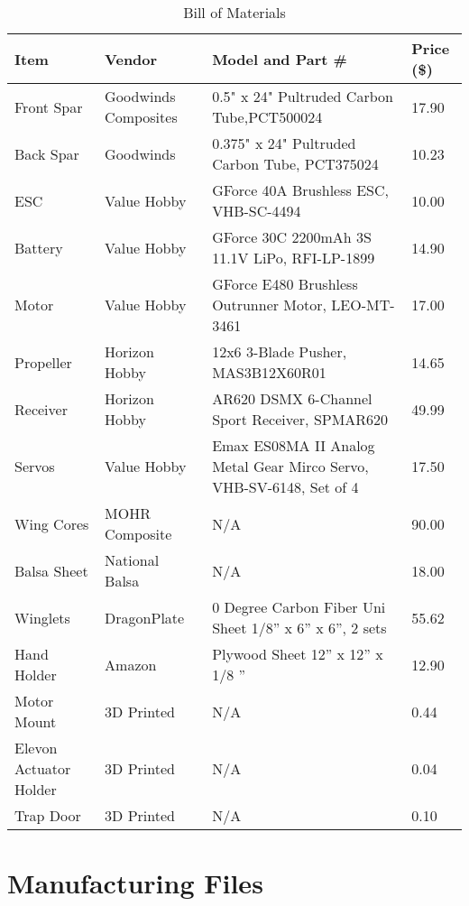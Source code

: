     \begin{table}[H]
    \centering
    \caption{Bill of Materials} \label{tab:bom}
    \begin{tabular}{|p{1.25in}|p{1.25in}|p{2.75in}|p{.75in}|}
    \hline
    \textbf{Item} & \textbf{Vendor} & \textbf{Model and Part \#} & \textbf{Price (\$)} \\
    \hline
    Front Spar & Goodwinds Composites & 0.5" x 24" Pultruded Carbon Tube,PCT500024 & 17.90   \\ \hline
    Back Spar     & Goodwinds& 0.375" x 24" Pultruded Carbon Tube, PCT375024 & 10.23   \\ \hline
    ESC           & Value Hobby & GForce 40A Brushless ESC, VHB-SC-4494 & 10.00 \\ \hline
    Battery       & Value Hobby & GForce 30C 2200mAh 3S 11.1V LiPo, RFI-LP-1899 & 14.90 \\ \hline
    Motor         & Value Hobby & GForce E480 Brushless Outrunner Motor, LEO-MT-3461 & 17.00   \\ \hline
    Propeller     & Horizon Hobby   & 12x6 3-Blade Pusher, MAS3B12X60R01 & 14.65 \\ \hline
    Receiver      & Horizon Hobby   & AR620 DSMX 6-Channel Sport Receiver, SPMAR620 & 49.99 \\ \hline
    Servos        & Value Hobby & Emax ES08MA II Analog Metal Gear Mirco Servo, VHB-SV-6148, Set of 4 & 17.50 \\ \hline
    Wing Cores & MOHR Composite & N/A & 90.00 \\ \hline
    Balsa Sheet & National Balsa & N/A & 18.00 \\ \hline
    Winglets & DragonPlate & 0 Degree Carbon Fiber Uni Sheet 1/8'' x 6'' x 6'', 2 sets & 55.62 \\ \hline
    Hand Holder & Amazon & Plywood Sheet 12'' x 12'' x 1/8 '' & 12.90 \\ \hline
    Motor Mount & 3D Printed & N/A & 0.44 \\ \hline
    Elevon Actuator Holder & 3D Printed  & N/A & 0.04 \\ \hline
    Trap Door     & 3D Printed  & N/A & 0.10    \\ \hline
    \end{tabular}
    \end{table}
    
\section{Manufacturing Files}
    
